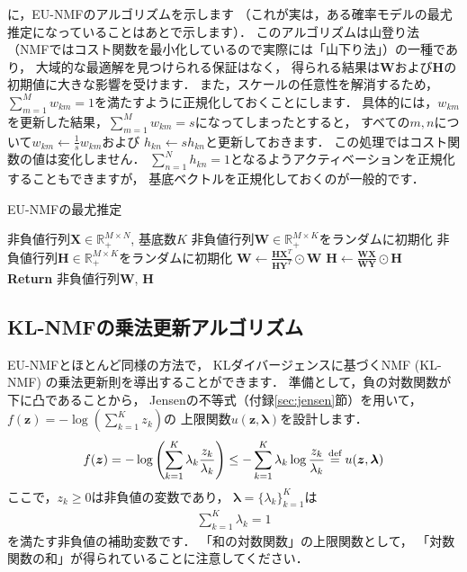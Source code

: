 に，EU-NMFのアルゴリズムを示します
（これが実は，ある確率モデルの最尤推定になっていることはあとで示します）．
このアルゴリズムは山登り法（NMFではコスト関数を最小化しているので実際には「山下り法」）の一種であり，
大域的な最適解を見つけられる保証はなく，
得られる結果は$\bm{W}$および$\bm{H}$の初期値に大きな影響を受けます．
また，スケールの任意性を解消するため，
$\sum_{m=1}^M w_{km} = 1$を満たすように正規化しておくことにします．
具体的には，$w_{km}$を更新した結果，$\sum_{m=1}^M w_{km} = s$になってしまったとすると，
すべての$m,n$について$w_{km} \gets \frac{1}{s} w_{km}$および
$h_{kn} \gets s h_{kn}$と更新しておきます．
この処理ではコスト関数の値は変化しません．
$\sum_{n=1}^N h_{kn} = 1$となるようアクティベーションを正規化することもできますが，
基底ベクトルを正規化しておくのが一般的です．
\begin{algobox}{EU-NMFの最尤推定}
\label{algo:eu-nmf-ml}
\begin{algorithmic}[1]
\Require 非負値行列$\bm{X} \in \mathbb{R}_+^{M \times N}$, 基底数$K$
\State 非負値行列$\bm{W} \in \mathbb{R}_+^{M \times K}$をランダムに初期化
\State 非負値行列$\bm{H} \in \mathbb{R}_+^{M \times K}$をランダムに初期化
\State $\displaystyle \bm{W} \gets \frac{\bm{H}\bm{X}^T}{\bm{H}\bm{Y}^T} \odot \bm{W}$ 
\State $\displaystyle \bm{H} \gets \frac{\bm{W}\bm{X}}{\bm{W}\bm{Y}} \odot \bm{H}$ 
\EndWhile\\
{\bf Return} 非負値行列$\bm{W}$, $\bm{H}$
\end{algorithmic}
\end{algobox}

\subsection{KL-NMFの乗法更新アルゴリズム}

EU-NMFとほとんど同様の方法で，
KLダイバージェンスに基づくNMF (KL-NMF) の乗法更新則を導出することができます．
準備として，負の対数関数が下に凸であることから，
Jensenの不等式（付録\ref{sec:jensen}節）を用いて，
$f(\bm{z}) = - \log \left(\sum_{k=1}^K z_k \right)$の
上限関数$u(\bm{z},\bm\lambda)$を設計します．
\begin{align}
f(\bm{z})
= - \log \left(\sum_{k=1}^K \lambda_k \frac{z_k}{\lambda_k}\right)
\le - \sum_{k=1}^K \lambda_k \log \frac{z_k}{\lambda_k}
\overset{\mbox{\scriptsize{def}}}{=}
u(\bm{z},\bm\lambda)
\label{eqn:log_aux}
\end{align}
ここで，$z_k \ge 0$は非負値の変数であり，
$\bm\lambda = \{\lambda_k\}_{k=1}^K$は
\begin{align}
\sum_{k=1}^K \lambda_k = 1
\label{eqn:kl_lambda_constraint}
\end{align}
を満たす非負値の補助変数です．
「和の対数関数」の上限関数として，
「対数関数の和」が得られていることに注意してください．


